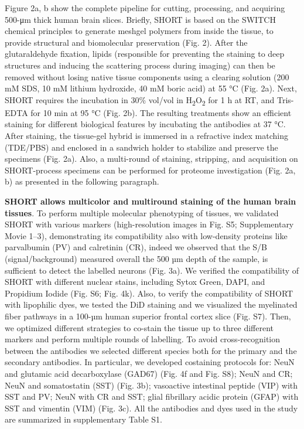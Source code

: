 \documentclass{article}
\begin{document}

Figure 2a, b show the complete pipeline for cutting, processing, and acquiring 500-μm thick human brain slices. Briefly, SHORT is based on the SWITCH chemical principles to generate meshgel polymers from inside the tissue, to provide structural and biomolecular preservation (Fig. 2). After the glutaraldehyde fixation, lipids (responsible for preventing the staining to deep structures and inducing the scattering process during imaging) can then be removed without losing native tissue components using a clearing solution (200 mM SDS, 10 mM lithium hydroxide, 40 mM boric acid) at 55 °C (Fig. 2a). Next, SHORT requires the incubation in 30\% vol/vol in H\textsubscript{2}O\textsubscript{2} for 1 h at RT, and Tris-EDTA for 10 min at 95 °C (Fig. 2b). The resulting treatments show an efficient staining for different biological features by incubating the antibodies at 37 °C. After staining, the tissue-gel hybrid is immersed in a refractive index matching (TDE/PBS) and enclosed in a sandwich holder to stabilize and preserve the specimens (Fig. 2a). Also, a multi-round of staining, stripping, and acquisition on SHORT-process specimens can be performed for proteome investigation (Fig. 2a, b) as presented in the following paragraph.

\textbf{SHORT allows multicolor and multiround staining of the human brain tissues}. To perform multiple molecular phenotyping of tissues, we validated SHORT with various markers (high-resolution images in Fig. S5; Supplementary Movie 1–3), demonstrating its compatibility also with low-density proteins like parvalbumin (PV) and calretinin (CR), indeed we observed that the S/B (signal/background) measured overall the 500 µm depth of the sample, is sufficient to detect the labelled neurons (Fig. 3a). We verified the compatibility of SHORT with different nuclear stains, including Sytox Green, DAPI, and Propidium Iodide (Fig. S6; Fig. 4k). Also, to verify the compatibility of SHORT with lipophilic dyes, we tested the DiD staining and we visualized the myelinated fiber pathways in a 100-µm human superior frontal cortex slice (Fig. S7). Then, we optimized different strategies to co-stain the tissue up to three different markers and perform multiple rounds of labelling. To avoid cross-recognition between the antibodies we selected different species both for the primary and the secondary antibodies. In particular, we developed costaining protocols for: NeuN and glutamic acid decarboxylase (GAD67) (Fig. 4f and Fig. S8); NeuN and CR; NeuN and somatostatin (SST) (Fig. 3b); vasoactive intestinal peptide (VIP) with SST and PV; NeuN with CR and SST; glial fibrillary acidic protein (GFAP) with SST and vimentin (VIM) (Fig. 3c). All the antibodies and dyes used in the study are summarized in supplementary Table S1.
\end{document}
